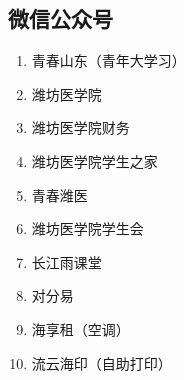 {\begin{minipage}{0.40\textwidth}
        \subsection[微信公众号]{微信公众号}
        \begin{enumerate}
            \item 青春山东（青年大学习）
            \item 潍坊医学院
            \item 潍坊医学院财务
            \item 潍坊医学院学生之家
            \item 青春潍医
            \item 潍坊医学院学生会
            \item 长江雨课堂
            \item 对分易
            \item 海享租（空调）
            \item 流云海印（自助打印）
        \end{enumerate}
    \end{minipage}
}



